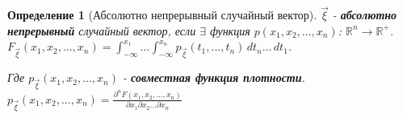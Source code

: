 \documentclass[14pt]{extarticle}
\theoremstyle{breakstyle}
\newtheorem{definition}{Определение}[subsection]
\begin{document}
\begin{definition}[Абсолютно непрерывный случайный вектор]

$\vec{\xi}$ - \textbf{абсолютно непрерывный} случайный вектор, если $\exists$ функция $p(x_{1}, x_{2}, ..., x_{n})$: $\mathbb{R}^{n} \rightarrow \mathbb{R}^{+}$. \\
$F_{\vec{\xi}}(x_1, x_2, ..., x_n) = \int_{-\infty}^{x_1} ... \int_{-\infty}^{x_n} p_{\vec{\xi}}(t_1, ..., t_n) \, dt_n ... \, dt_1$.

\vspace{\baselineskip}

Где $p_{\vec{\xi}}(x_{1}, x_{2}, ..., x_{n})$ - \textbf{совместная функция плотности}.\\
$p_{\vec{\xi}}(x_{1}, x_{2}, ..., x_{n}) = \frac{\partial^n F(x_{1}, x_{2}, ..., x_{n})}{\partial x_{1} \partial x_{2} ... \partial x_{n}}$

\end{definition}
\end{document}
